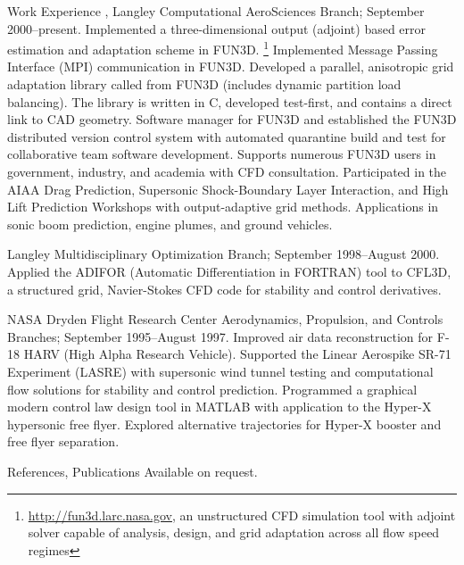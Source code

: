 \documentclass{resume}
\begin{document}
\begin{category}{Work Experience}
, Langley Computational AeroSciences Branch;
September 2000--present.
Implemented a three-dimensional output (adjoint) based error
estimation and adaptation scheme in FUN3D.%
\footnote{\url{http://fun3d.larc.nasa.gov}, an unstructured CFD simulation tool with adjoint solver capable of analysis, design, and grid adaptation
across all flow speed regimes} 
Implemented Message Passing Interface (MPI) communication in FUN3D.
Developed a parallel, anisotropic grid adaptation
library called from FUN3D (includes dynamic partition load balancing).
The library is
written in C, developed test-first, and contains a direct link to CAD geometry.
Software manager for FUN3D and established the FUN3D distributed version 
control system with automated quarantine build and test
for collaborative team software development.
Supports numerous FUN3D users in government, industry, and academia with CFD
consultation.
Participated in the AIAA Drag Prediction,
Supersonic Shock-Boundary Layer Interaction,
and High Lift Prediction Workshops with output-adaptive grid methods.
Applications in sonic boom prediction, engine plumes, and ground vehicles.

 Langley Multidisciplinary Optimization Branch;
September 1998--August 2000.
Applied the ADIFOR (Automatic Differentiation in FORTRAN) tool to
CFL3D, a structured grid, Navier-Stokes CFD code
for stability and control derivatives.

NASA Dryden Flight Research Center Aerodynamics, Propulsion, and Controls
Branches; September 1995--August 1997. 
Improved air data reconstruction for F-18 HARV (High Alpha
Research Vehicle). Supported the Linear Aerospike
SR-71 Experiment (LASRE) with supersonic wind tunnel testing and
computational flow solutions for stability and control prediction.
Programmed a graphical modern control law design tool in MATLAB with
application to the Hyper-X hypersonic free flyer.
Explored alternative trajectories for
Hyper-X booster and free flyer separation.


\end{category}


\begin{category}{References, Publications} 
\citemnobullet Available on request.
\end{category}
\end{document}
